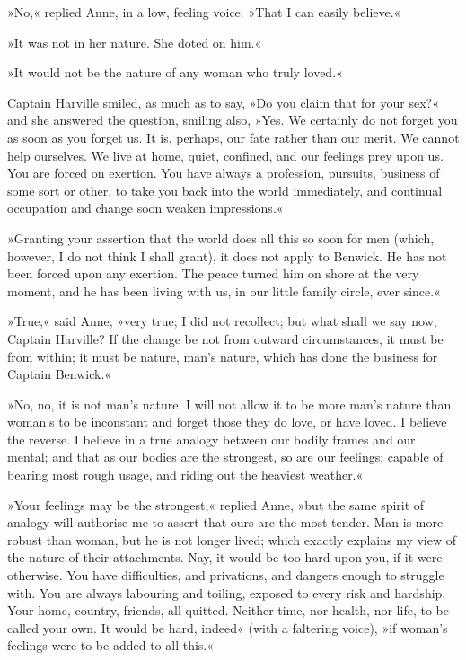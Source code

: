 »No,« replied Anne, in a low, feeling voice. »That I can easily believe.«

»It was not in her nature. She doted on him.«

»It would not be the nature of any woman who truly loved.«

Captain Harville smiled, as much as to say, »Do you claim that for your sex?« and she answered the question, smiling also, »Yes. We certainly do not forget you as soon as you forget us. It is, perhaps, our fate rather than our merit. We cannot help ourselves. We live at home, quiet, confined, and our feelings prey upon us. You are forced on exertion. You have always a profession, pursuits, business of some sort or other, to take you back into the world immediately, and continual occupation and change soon weaken impressions.«

»Granting your assertion that the world does all this so soon for men (which, however, I do not think I shall grant), it does not apply to Benwick. He has not been forced upon any exertion. The peace turned him on shore at the very moment, and he has been living with us, in our little family circle, ever since.«

»True,« said Anne, »very true; I did not recollect; but what shall we say now, Captain Harville? If the change be not from outward circumstances, it must be from within; it must be nature, man's nature, which has done the business for Captain Benwick.«

»No, no, it is not man's nature. I will not allow it to be more man's nature than woman's to be inconstant and forget those they do love, or have loved. I believe the reverse. I believe in a true analogy between our bodily frames and our mental; and that as our bodies are the strongest, so are our feelings; capable of bearing most rough usage, and riding out the heaviest weather.«

»Your feelings may be the strongest,« replied Anne, »but the same spirit of analogy will authorise me to assert that ours are the most tender. Man is more robust than woman, but he is not longer lived; which exactly explains my view of the nature of their attachments. Nay, it would be too hard upon you, if it were otherwise. You have difficulties, and privations, and dangers enough to struggle with. You are always labouring and toiling, exposed to every risk and hardship. Your home, country, friends, all quitted. Neither time, nor health, nor life, to be called your own. It would be hard, indeed« (with a faltering voice), »if woman's feelings were to be added to all this.«

